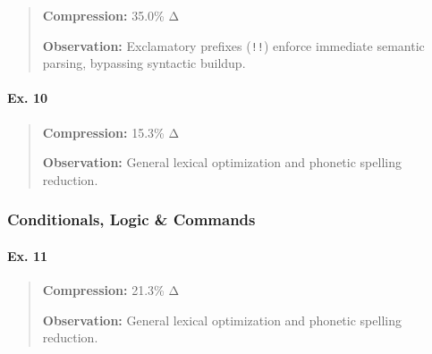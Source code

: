 \begin{quote}
\textbf{Compression:} 35.0\% Δ

\textbf{Observation:} Exclamatory prefixes (\texttt{!!}) enforce
immediate semantic parsing, bypassing syntactic buildup.
\end{quote}

\paragraph{Ex. 10}\label{ex.-10}

\begin{Shaded}
\begin{Highlighting}[]
\end{Highlighting}
\end{Shaded}

\begin{quote}
\textbf{Compression:} 15.3\% Δ

\textbf{Observation:} General lexical optimization and phonetic spelling
reduction.
\end{quote}

\subsubsection{Conditionals, Logic \&
Commands}\label{conditionals-logic-commands}

\paragraph{Ex. 11}\label{ex.-11}

\begin{Shaded}
\begin{Highlighting}[]
\end{Highlighting}
\end{Shaded}

\begin{quote}
\textbf{Compression:} 21.3\% Δ

\textbf{Observation:} General lexical optimization and phonetic spelling
reduction.
\end{quote}

